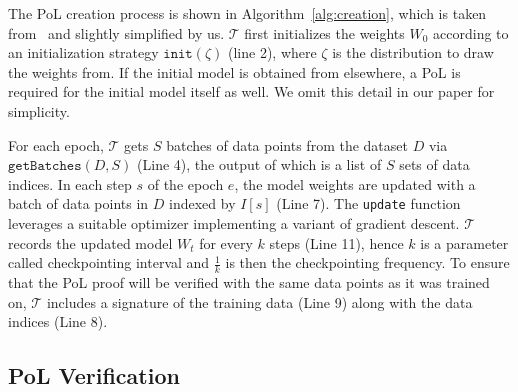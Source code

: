 \documentclass[conference]{IEEEtran}
\newcommand{\Prov}{\mathcal{T}\xspace}
\begin{document}
The PoL {creation\EndAccSupp{}} process is {shown\EndAccSupp{}} in Algorithm~\ref{alg:creation}, which is taken from~\cite{PoL} and slightly simplified by us.
$\Prov$ first initializes the weights $W_0$ according to an initialization strategy $\texttt{init}(\zeta)$ (line 2), where $\zeta$ is the distribution to draw the weights from.
If the initial model is obtained from elsewhere, a PoL is required for the initial model itself as well. 
We omit this detail in our paper for simplicity.

For each epoch, $\Prov$ gets $S$ batches of data points from the {dataset\EndAccSupp{}} $D$ via $\texttt{getBatches}(D, S)$ (Line 4), the {output\EndAccSupp{}} of which is a list of $S$ sets of data indices. 
In each {step\EndAccSupp{}} $s$ of the epoch $e$, the model weights are updated with a batch of data points in $D$ indexed by $I[s]$ (Line 7).
The \texttt{update} function leverages a suitable optimizer implementing a {variant\EndAccSupp{}} of {gradient\EndAccSupp{}} descent.
$\Prov$ records the updated model $W_t$ for every $k$ steps (Line 11), hence $k$ is a {parameter\EndAccSupp{}} called checkpointing interval and $\frac{1}{k}$ is then the checkpointing frequency.
To ensure that the PoL proof will be verified with the same data points as it was trained on, 
$\Prov$ includes a signature of the training data (Line 9) along with the data indices (Line 8).


\subsection{PoL Verification}
\label{sec:verification}
\end{document}
